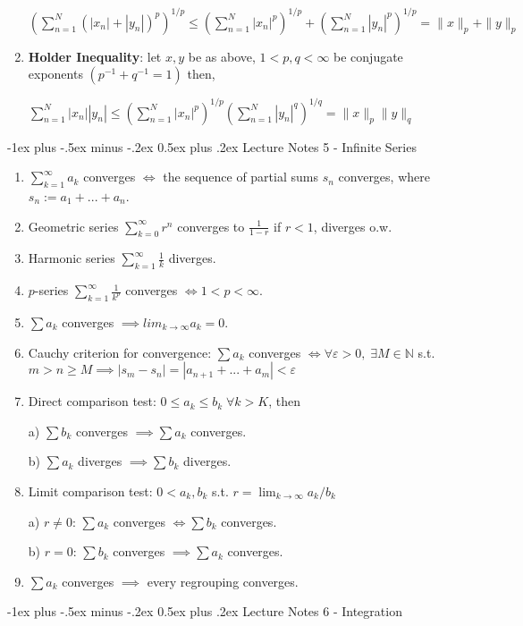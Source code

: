 \documentclass[10pt,landscape]{article}
\makeatletter
\renewcommand{\section}{\@startsection{section}{1}{0mm}%
                                {-1ex plus -.5ex minus -.2ex}%
                                {0.5ex plus .2ex}%
                                {\normalfont\large\bfseries}}
\makeatother
\begin{document}
\begin{multicols}{3}
\begin{enumerate}
$
\left(\sum^N_{n=1} ( |x_n|+|y_n| )^p \right)^{1/p}  \leq \left( \sum^N_{n=1} |x_n|^p \right)^{1/p}+ \left( \sum^N_{n=1} |y_n|^p \right)^{1/p} 
= \|x\|_p +\|y\|_p
$
	\item \textbf{Holder Inequality}: let $x,y$ be as above, $1<p,q<\infty$ be conjugate exponents $(p^{-1}+ q^{-1} = 1)$ then, 
	
$\sum^N_{n=1} |x_n| |y_n| \leq \left( \sum^N_{n=1} |x_n|^p \right)^{1/p}\left( \sum^N_{n=1} |y_n|^q \right)^{1/q} = \| x\|_p \| y\|_q $

\end{enumerate}


\section{Lecture Notes 5 - Infinite Series}
\begin{enumerate}
	\item $\sum^\infty_{k=1} a_k $ converges $\iff$ the sequence of partial sums $s_n$ converges, where $s_n := a_1 + ... + a_n$.
	\item Geometric series $\sum^\infty_{k=0} r^n $ converges to $\frac{1}{1-r}$ if $r<1$, diverges o.w.
	\item Harmonic series $\sum^\infty_{k=1}\frac{1}{k}$ diverges.
	\item $p$-series $\sum^\infty_{k=1}\frac{1}{k^p}$ converges $ \iff 1<p<\infty$.
	\item $\sum a_k$ converges $ \implies lim_{k\rightarrow \infty} a_k = 0$.
	\item Cauchy criterion for convergence: $\sum a_k$ converges $\iff \forall \varepsilon >0, \; \exists M\in \mathbb{N} $ s.t. $m>n\geq M  \implies |s_m -s_n| = |a_{n+1} + ...+ a_m | < \varepsilon$
	\item Direct comparison test: $0\leq a_k\leq b_k \; \forall k>K$, then
	
	a) $\sum b_k$ converges $\implies \sum a_k$ converges.
	
	b) $\sum a_k$ diverges $\implies \sum b_k$ diverges.
	\item Limit comparison test: $0<a_k, b_k $ s.t. $r = \lim_{k\rightarrow \infty} a_k/b_k$
	
	a) $r\neq 0$: $\sum a_k$ converges $\iff \sum b_k$ converges.
	
	b) $r = 0$: $\sum b_k$ converges $\implies \sum a_k$ converges. 
	
	\item $\sum a_k$ converges $\implies$ every regrouping converges.

	 
\end{enumerate}

\section{Lecture Notes 6 - Integration}

\end{multicols}
\end{document}
